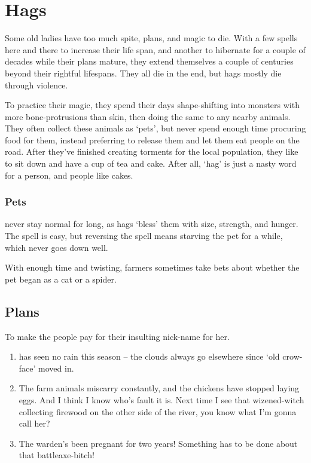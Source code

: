 \section[Hag]{Hags}
\label{hag}

\begin{multicols}{2}

\noindent
Some old ladies have too much spite, plans, and magic to die.
With a few spells here and there to increase their life span, and another to hibernate for a couple of decades while their plans mature, they extend themselves a couple of centuries beyond their rightful lifespans.
They all die in the end, but hags mostly die through violence.

To practice their magic, they spend their days shape-shifting into monsters with more bone-protrusions than skin, then doing the same to any nearby animals.
They often collect these animals as `pets', but never spend enough time procuring food for them, instead preferring to release them and let them eat people on the road.
After they've finished creating torments for the local population, they like to sit down and have a cup of tea and cake.
After all, `hag' is just a nasty word for a person, and people like cakes.

\hag

\showStdSpells

\subsubsection{Pets}
never stay normal for long, as hags `bless' them with size, strength, and hunger.
The spell is easy, but reversing the spell means starving the pet for a while, which never goes down well.

\ifodd\value{r4}
\else
\fi

With enough time and twisting, farmers sometimes take bets about whether the pet began as a cat or a spider.

\subsection{Plans}

\begin{dlist}
  \item
  To make the people pay for their insulting nick-name for her.
  \begin{enumerate}
    \item
     has seen no rain this season -- the clouds always go elsewhere since `old crow-face' moved in.
    \item
    The farm animals miscarry constantly, and the chickens have stopped laying eggs.
    And I think I know who's fault it is.
    Next time I see that wizened-\gls{witch} collecting firewood on the other side of the river, you know what I'm gonna call her?
    \item
    The \gls{warden}'s been pregnant for two years!
    Something has to be done about that battleaxe-bitch!
  \end{enumerate}


\end{dlist}
\end{multicols}
